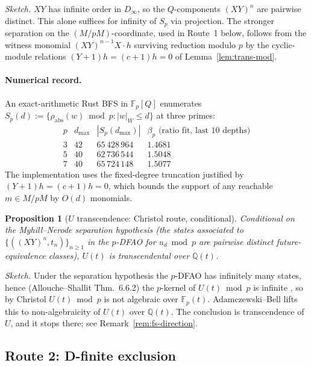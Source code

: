 \documentclass[11pt]{article}
\theoremstyle{plain}
\newtheorem{proposition}[theorem]{Proposition}
\theoremstyle{definition}
\theoremstyle{remark}
\begin{document}
\emph{Sketch.}  $XY$ has infinite order in $D_\infty$, so the
$Q$-components $(XY)^n$ are pairwise distinct.  This alone suffices for
infinity of $S_p$ via projection.  The stronger separation on the
$(M/pM)$-coordinate, used in Route~1 below, follows from the witness
monomial $(XY)^{n-1} X \cdot h$ surviving reduction modulo $p$ by the
cyclic-module relations $(Y+1)h = (c+1)h = 0$ of Lemma~\ref{lem:trans-mod}.

\paragraph{Numerical record.}
An exact-arithmetic Rust BFS in $\mathbb{F}_p[Q]$ enumerates $S_p(d) :=
\{\rho_{\mathrm{abs}}(w) \bmod p : |w|_W \le d\}$ at three primes:
\[
\begin{array}{c|c|c|c}
p & d_{\max} & |S_p(d_{\max})| & \beta_p \text{ (ratio fit, last 10 depths)} \\ \hline
3 & 42 & 65\,428\,964 & 1.4681 \\
5 & 40 & 62\,736\,544 & 1.5048 \\
7 & 40 & 65\,724\,148 & 1.5077
\end{array}
\]
The implementation uses the fixed-degree truncation justified by
$(Y+1)h = (c+1)h = 0$, which bounds the support of any reachable
$m \in M/pM$ by $O(d)$ monomials.

\begin{proposition}[$U$ transcendence: Christol route, conditional]
\label{prop:beta2-christol}
Conditional on the Myhill--Nerode separation hypothesis (the states
associated to $\{((XY)^n, t_n)\}_{n \ge 1}$ in the $p$-DFAO for
$u_d \bmod p$ are pairwise distinct future-equivalence classes), $U(t)$
is transcendental over $\mathbb{Q}(t)$.
\end{proposition}

\emph{Sketch.}  Under the separation hypothesis the $p$-DFAO has
infinitely many states, hence (Allouche--Shallit Thm.~6.6.2) the
$p$-kernel of $U(t) \bmod p$ is infinite \cite{AlloucheShallit}, so by
Christol \cite{Christol1979,CKMR} $U(t) \bmod p$ is not algebraic over
$\mathbb{F}_p(t)$.  Adamczewski--Bell \cite{AdamczewskiBell2017} lifts this to
non-algebraicity of $U(t)$ over $\mathbb{Q}(t)$.
The conclusion is transcendence of $U$, and it stops there;
see Remark~\ref{rem:fs-direction}.

\subsection{Route 2: D-finite exclusion}
\label{ssec:dfinite-route}
\end{document}
